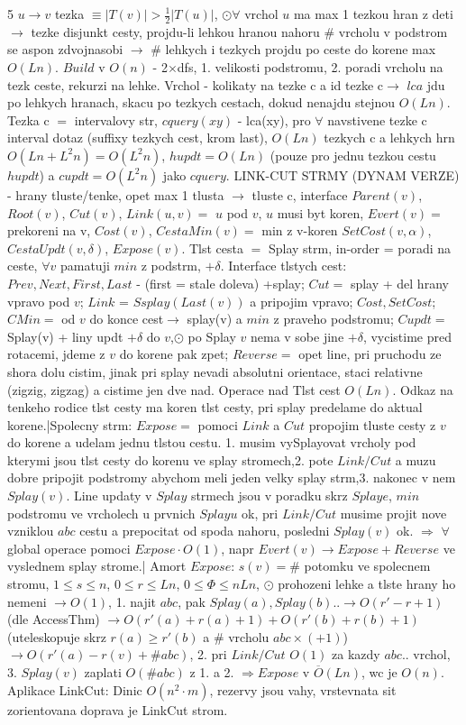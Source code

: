 \documentclass[8pt]{extarticle}
\begin{document}
\begin{multicols*}{5}
$u\rightarrow v$ tezka $\equiv |T(v)|>\frac{1}{2}|T(u)|$, $\odot \forall$ vrchol $u$ ma max 1 tezkou hran z deti $\rightarrow$ tezke disjunkt cesty, projdu-li lehkou hranou nahoru $\#$ vrcholu v podstrom se aspon zdvojnasobi $\rightarrow$ \# lehkych  i tezkych projdu po ceste do korene max $O(Ln)$. $Build$ v $O(n)$ - 2$\times$dfs, 1. velikosti podstromu, 2. poradi vrcholu na tezk ceste, rekurzi na lehke. Vrchol - kolikaty na tezke c a id tezke c$\rightarrow$ $lca$ jdu po lehkych hranach, skacu po tezkych cestach, dokud nenajdu stejnou $O(Ln)$. Tezka c $=$ intervalovy str, $cquery(xy)$ - lca(xy), pro $\forall$ navstivene tezke c interval dotaz (suffixy tezkych cest, krom last), $O(Ln)$ tezkych c a lehkych hrn $O(Ln + L^2n)=O(L^2n)$, $hupdt = O(Ln)$ (pouze pro jednu tezkou cestu $hupdt$) a $cupdt = O(L^2n)$ jako $cquery$. LINK-CUT STRMY (DYNAM VERZE) - hrany tluste/tenke, opet max 1 tlusta $\rightarrow$ tluste c, interface $Parent(v)$, $Root(v)$, $Cut(v)$, $Link(u,v)=$ $u$ pod $v$, $u$ musi byt koren, $Evert(v)=$ prekoreni na v, $Cost(v)$, $CestaMin(v)=$ min z v-koren $SetCost(v,\alpha)$, $CestaUpdt(v,\delta)$, $Expose(v)$.  Tlst cesta $=$ Splay strm, in-order = poradi na ceste, $\forall v$ pamatuji $min$ z podstrm, $+\delta$. Interface tlstych cest: $Prev, Next, First, Last$ - (first = stale doleva) +splay; $Cut =$ splay + del hrany vpravo pod $v$; $Link$ = $Ssplay(Last(v))$ a pripojim vpravo; $Cost, SetCost$; $CMin =$ od $v$ do konce cest$\rightarrow$ splay(v) a $min$ z praveho podstromu; $Cupdt =$ Splay(v) + liny updt $+\delta$ do $v$,$\odot$ po Splay $v$ nema v sobe jine $+\delta$, vycistime pred rotacemi, jdeme z $v$ do korene pak zpet; $Reverse =$ opet line, pri pruchodu ze shora dolu cistim, jinak pri splay nevadi absolutni orientace, staci relativne (zigzig, zigzag) a cistime jen dve nad. Operace nad Tlst cest $O(Ln)$. Odkaz na tenkeho rodice tlst cesty ma koren tlst cesty, pri splay predelame do aktual korene.|Spolecny strm: $Expose =$ pomoci $Link$ a $Cut$ propojim tluste cesty z $v$ do korene a udelam jednu tlstou cestu. 1. musim vySplayovat vrcholy pod kterymi jsou tlst cesty do korenu ve splay stromech,2. pote $Link/Cut$ a muzu dobre pripojit podstromy abychom meli jeden velky splay strm,3. nakonec v nem $Splay(v)$. Line updaty v $Splay$ strmech jsou v poradku skrz $Splaye$, $min$ podstromu ve vrcholech u prvnich $Splayu$ ok, pri $Link/Cut$ musime projit nove vzniklou $abc$ cestu a prepocitat od spoda nahoru, posledni $Splay(v)$ ok. $\Rightarrow$ $\forall$ global operace pomoci $Expose \cdot O(1)$, napr $Evert(v)\rightarrow Expose + Reverse$ ve vyslednem splay strome.| Amort $Expose$: $s(v) = \#$ potomku ve spolecnem stromu, $1\leq s\leq n$, $0\leq r\leq Ln$, $0\leq \Phi\leq nLn$, $\odot$ prohozeni lehke a tlste hrany ho nemeni $\rightarrow O(1)$, 1. najit $abc$, pak $Splay(a), Splay(b).. \rightarrow O(r'-r+1)$ (dle AccessThm) $\rightarrow O(r'(a)+r(a)+1)+O(r'(b)+r(b)+1)$ (uteleskopuje skrz $r(a) \geq r'(b)$ a \# vrcholu $abc \times (+1)$) $\rightarrow O(r'(a)-r(v)+\# abc)$, 2. pri $Link/Cut$ $O(1)$ za kazdy $abc..$ vrchol, 3. $Splay(v)$ zaplati $O(\# abc)$ z 1. a 2. $\Rightarrow Expose$ v $\overline{O}(Ln)$, wc je $O(n)$. Aplikace LinkCut: Dinic $O(n^2\cdot m)$, rezervy jsou vahy, vrstevnata sit zorientovana doprava je LinkCut strom. 
\end{multicols*}
\end{document}

